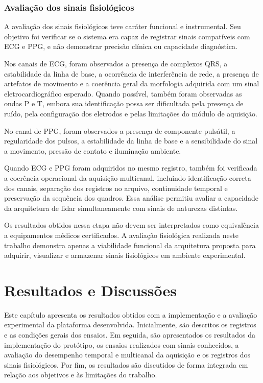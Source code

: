 \documentclass[a4paper,12pt]{fcte}
\begin{document}
\subsection{Avaliação dos sinais fisiológicos}
\label{subsec:avaliacao_fisiologica}

A avaliação dos sinais fisiológicos teve caráter funcional e instrumental. Seu objetivo foi verificar se o sistema era capaz de registrar sinais compatíveis com ECG e PPG, e não demonstrar precisão clínica ou capacidade diagnóstica.

Nos canais de ECG, foram observados a presença de complexos QRS, a estabilidade da linha de base, a ocorrência de interferência de rede, a presença de artefatos de movimento e a coerência geral da morfologia adquirida com um sinal eletrocardiográfico esperado. Quando possível, também foram observadas as ondas P e T, embora sua identificação possa ser dificultada pela presença de ruído, pela configuração dos eletrodos e pelas limitações do módulo de aquisição.

No canal de PPG, foram observados a presença de componente pulsátil, a regularidade dos pulsos, a estabilidade da linha de base e a sensibilidade do sinal a movimento, pressão de contato e iluminação ambiente.

Quando ECG e PPG foram adquiridos no mesmo registro, também foi verificada a coerência operacional da aquisição multicanal, incluindo identificação correta dos canais, separação dos registros no arquivo, continuidade temporal e preservação da sequência dos quadros. Essa análise permitiu avaliar a capacidade da arquitetura de lidar simultaneamente com sinais de naturezas distintas.

Os resultados obtidos nessa etapa não devem ser interpretados como equivalência a equipamentos médicos certificados. A avaliação fisiológica realizada neste trabalho demonstra apenas a viabilidade funcional da arquitetura proposta para adquirir, visualizar e armazenar sinais fisiológicos em ambiente experimental.



\chapter{Resultados e Discussões}
\label{cap:resultados}

Este capítulo apresenta os resultados obtidos com a implementação e a avaliação experimental da plataforma desenvolvida. Inicialmente, são descritos os registros e as condições gerais dos ensaios. Em seguida, são apresentados os resultados da implementação do protótipo, os ensaios realizados com sinais conhecidos, a avaliação do desempenho temporal e multicanal da aquisição e os registros dos sinais fisiológicos. Por fim, os resultados são discutidos de forma integrada em relação aos objetivos e às limitações do trabalho.
\end{document}
